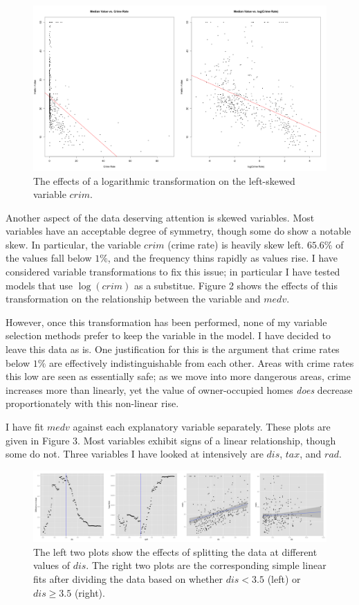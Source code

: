 \documentclass[12pt]{article}
\begin{document}
\begin{figure}[ht!]
\centering
\includegraphics[width=150mm]{crimplot.png}
\caption{The effects of a logarithmic transformation on the left-skewed variable $crim$.}
\end{figure}

Another aspect of the data deserving attention is skewed variables.  Most variables have an acceptable degree of symmetry, though some do show a notable skew.  In particular, the variable $crim$ (crime rate) is heavily skew left.  $65.6\%$ of the values fall below $1\%$, and the frequency thins rapidly as values rise.  I have considered variable transformations to fix this issue; in particular I have tested models that use $\log(crim)$ as a substitue.  Figure 2 shows the effects of this transformation on the relationship between the variable and $medv$.

However, once this transformation has been performed, none of my variable selection methods prefer to keep the variable in the model.  I have decided to leave this data as is.  One justification for this is the argument that crime rates below $1\%$ are effectively indistinguishable from each other.  Areas with crime rates this low are seen as essentially safe; as we move into more dangerous areas, crime increases more than linearly, yet the value of owner-occupied homes \emph{does} decrease proportionately with this non-linear rise.

I have fit $medv$ against each explanatory variable separately.  These plots are given in Figure 3.  Most variables exhibit signs of a linear relationship, though some do not.  Three variables I have looked at intensively are $dis$, $tax$, and $rad$.

\begin{figure}[ht!]
\centering
\includegraphics[width=180mm]{displot.png}
\caption{The left two plots show the effects of splitting the data at different values of $dis$.  The right two plots are the corresponding simple linear fits after dividing the data based on whether $dis < 3.5$ (left) or $dis \geq 3.5$ (right).}
\end{figure}
\end{document}
